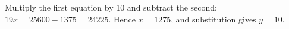 Multiply the first equation by 10 and subtract the second: $19x=25600-1375=24225$. Hence $\boxed{x=1275}$, and substitution gives $y=10$.

